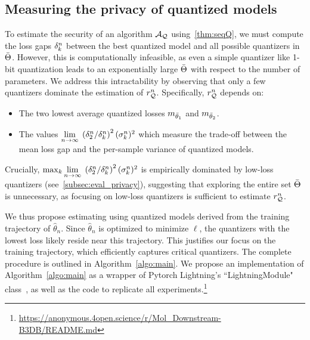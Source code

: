 \subsection{Measuring the privacy of quantized models}
\label{ssec:algo}

To estimate the security of an algorithm ${\mathcal{A}}_{{\mathcal{Q}}}$ using~\autoref{thm:seqQ}, we must compute the loss gaps $\delta_{k}^n$ between the best quantized model and all possible quantizers in $\Bar{\Theta}$.
However, this is computationally infeasible, as even a simple quantizer like 1-bit quantization leads to an exponentially large $\Bar{\Theta}$ with respect to the number of parameters.
We address this intractability by observing that only a few quantizers dominate the estimation of $r_{{\mathcal{Q}}}^n$.
Specifically, $r_{{\mathcal{Q}}}^n$ depends on:
\begin{itemize}
\item The two lowest average quantized losses $m_{{\Bar{\theta}}_1}$ and $m_{{\Bar{\theta}}_2}$.
\item The values $\underset{n\to\infty}{\lim}\;\left(\delta_{2}^n/\delta_{k}^n\right)^2(\sigma_k^n)^2$ which measure the trade-off between the mean loss gap and the per-sample variance of quantized models.
\end{itemize}
Crucially, $\max_k\underset{n\to\infty}{\lim}\;\left(\delta_{2}^n/\delta_{k}^n\right)^2(\sigma_k^n)^2$ is empirically dominated by low-loss quantizers (see~\autoref{subsec:eval_privacy}), suggesting that exploring the entire set $\Bar{\Theta}$ is unnecessary, as focusing on low-loss quantizers is sufficient to estimate $r_{{\mathcal{Q}}}^n$.

We thus propose estimating using quantized models derived from the training trajectory of $\hat{\theta}_n$.
Since $\hat{\theta}_n$ is optimized to minimize $\ell$, the quantizers with the lowest loss likely reside near this trajectory.
This justifies our focus on the training trajectory, which efficiently captures critical quantizers.
The complete procedure is outlined in Algorithm~\ref{algo:main}.
We propose an implementation of Algorithm~\ref{algo:main} as a wrapper of Pytorch Lightning's ``LightningModule" class~\cite{Falcon_PyTorch_Lightning_2019}, as well as the code to replicate all experiments.\footnote{\url{https://anonymous.4open.science/r/Mol_Downstream-B3DB/README.md}}

